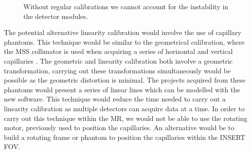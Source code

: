 \begin{figure}[!tbp]
  \centering
  \hfill
  \caption{Without regular calibrations we cannot account for the instability in the detector modules.}
\end{figure}

The potential alternative linearity calibration would involve the use of capillary phantoms. This technique would be similar to the geometrical calibration, where the \acrshort{MSS} collimator is used when acquiring a series of horizontal and vertical capillaries \cite{Smith1988AcquisitionAnalysis}. The geometric and linearity calibration both involve a geometric transformation, carrying out these transformations simultaneously would be possible as the geometric distortion is minimal. The projects acquired from these phantoms would present a series of linear lines which can be modelled with the new software. This technique would reduce the time needed to carry out a linearity calibration as multiple detectors can acquire data at a time. In order to carry out this technique within the \acrshort{MR}, we would not be able to use the rotating motor, previously used to position the capillaries. An alternative would be to build a rotating frame or phantom to position the capillaries within the \acrshort{INSERT} \acrshort{FOV}.
